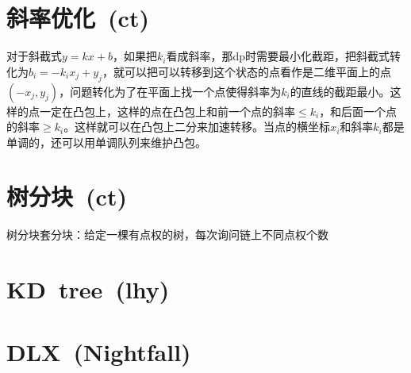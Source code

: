 \section{斜率优化\ \small(ct)}
    对于斜截式$ y = k x + b $，如果把$ k_i $看成斜率，那dp时需要最小化截距，把斜截式转化为$ b_i = - k_i x_j + y_j $，就可以把可以转移到这个状态的点看作是二维平面上的点$ (- x_j, y_j) $，问题转化为了在平面上找一个点使得斜率为$ k_i $的直线的截距最小。这样的点一定在凸包上，这样的点在凸包上和前一个点的斜率$ \leq k_i$，和后面一个点的斜率$ \geq k_i $。这样就可以在凸包上二分来加速转移。当点的横坐标$ x_i $和斜率$ k_i $都是单调的，还可以用单调队列来维护凸包。
\section{树分块\ \small(ct)}
    树分块套分块：给定一棵有点权的树，每次询问链上不同点权个数
\section{KD\ tree\ \small(lhy)}
\section{DLX\ \small(Nightfall)}
